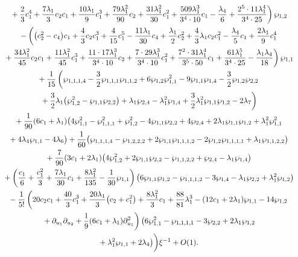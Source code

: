 \documentclass[pdftex]{sigma}
\numberwithin{equation}{section}
\begin{document}
\begin{gather*}
\left.\hphantom{0=}{}
 + \frac{2}{3} c_1^4 + \frac{7 \lambda_1}{3} c_2 c_1 + \frac{10 \lambda_1}{9} c_1^3 + \frac{79 \lambda_1^2}{90} c_2
 + \frac{31 \lambda_1^2}{30} c_1^2 + \frac{509 \lambda _1^3}{3^4 \cdot 10} c_1
 - \frac{\lambda _4}{6} + \frac{2^5\cdot 11 \lambda_1^4}{3^4 \cdot 25} \right) \wp_{1,2}\\
\hphantom{0=}{}
 - \left(\big(c_2^2 - c_4\big) c_1 + \frac{4}{3} c_2 c_1^3 + \frac{4}{15} c_1^5 - \frac{11 \lambda _1}{30} c_4 + \frac{\lambda _1}{2} c_2^2 + \frac{4}{3}\lambda_1 c_2 c_1^2 - \frac{\lambda_4}{5} c_1
 + \frac{2 \lambda_1}{9} c_1^4\right.\\
\left.\hphantom{0=}{}
+ \frac{34 \lambda _1^2}{45} c_2 c_1+ \frac{11 \lambda_1^2}{45} c_1^3 + \frac{11\cdot 17\lambda _1^3}{3^4 \cdot 10} c_2 + \frac{7\cdot 29 \lambda _1^3}{3^4\cdot 10} c_1^2 + \frac{7^2\cdot 31 \lambda _1^4}{3^5 \cdot 50} c_1
 + \frac{61 \lambda_1^5}{3^4\cdot 25} - \frac{\lambda _1 \lambda _4}{18}
 \right) \wp_{1,1} \\
\hphantom{0=}{} + \frac{1}{15} \left(\wp_{1,1,1,4} - \frac{3}{2}\wp_{1,1,1}\wp_{1,1,2}
 + 6 \wp_{1,2}\wp_{1,1}^2 - 9 \wp_{1,1}\wp_{1,4} - \frac{3}{2} \wp_{1,2}\wp_{2,2}\right. \\
\left.\hphantom{0=}{}
+ \frac{3}{2} \lambda_1 \big(\wp_{1,2}^2 - \wp_{1,1}\wp_{2,2}\big) +\lambda_1 \wp_{2,4} - \lambda_1^2 \wp_{1,4}
 + \frac{3}{2} \lambda_1^2 \wp_{1,1}\wp_{1,2} - 2 \lambda_7\right)\\
\hphantom{0=}{} + \frac{1}{90} (6c_1 + \lambda_1) \big(4\wp_{1,1}^2 - \wp_{1,1,1}^2 + \wp_{1,2}^2
 - 4 \wp_{1,1} \wp_{2,2} + 4 \wp_{2,4} + 2 \lambda_1 \wp_{1,1} \wp_{1,2} + \lambda_1^2 \wp_{1,1}^2 \\
\hphantom{0=}{} + 4 \lambda_4 \wp_{1,1} - 4\lambda_6 \big) +
 \frac{1}{60} \big(\wp_{1,1,1,4} - \wp_{1,2,2,2} + 2 \wp_{1,1} \wp_{1,1,1,2} - 2 \wp_{1,2} \wp_{1,1,1,1} + \lambda_1 \wp_{1,1,2,2}\big)\\
\hphantom{0=}{}
 + \frac{7}{90} (3 c_1 + 2\lambda_1) \big(4 \wp_{1,2}^2 + 2 \wp_{1,1} \wp_{2,2} - \wp_{1,1,2,2} + \wp_{2,4}
 - \lambda_1 \wp_{1,4} \big) \\
\hphantom{0=}{} + \left(\frac{c_1}{6} + \frac{c_1^2}{3} + \frac{7 \lambda_1}{30} c_1 + \frac{8 \lambda_1^2}{135} - \frac{1}{30} \wp_{1,1} \right)
 \big(6 \wp_{1,1}\wp_{1,2} - \wp_{1,1,1,2} - 3 \wp_{1,4} - \lambda_1 \wp_{2,2} + \lambda_1^2 \wp_{1,2} \big)\\
\hphantom{0=}{}
 - \frac{1}{5!} \left(20 c_2 c_1 + \frac{40}{3} c_1^3 + \frac{20 \lambda_1}{3} \big(c_2 + c_1^2\big) + \frac{8 \lambda_1^2}{3} c_1
 + \frac{88}{81} \lambda_1^3 - (12 c_1 + 2\lambda_1)\wp_{1,1} - 14 \wp_{1,2} \right.\\
\left. \hphantom{0=}{} + \partial_{u_1}\partial_{u_2}+ \frac{1}{9}(6c_1 +\lambda_1)
 \partial_{u_1}^2 \right) \big(6 \wp_{1,1}^2 - \wp_{1,1,1,1} - 3\wp_{2,2} + 2 \lambda_1 \wp_{1,2} \\
\hphantom{0=}{} + \lambda_1^2 \wp_{1,1} + 2\lambda_4\big) \bigg)\xi^{-1} + O(1).
\end{gather*}
\end{document}
